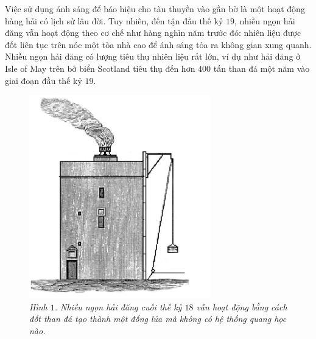 \begin{multicols}{2}
	Việc sử dụng ánh sáng để báo hiệu cho tàu thuyền vào gần bờ là một hoạt động hàng hải có lịch sử lâu đời. Tuy nhiên, đến tận đầu thế kỷ $19$, nhiều ngọn hải đăng vẫn hoạt động theo cơ chế như hàng nghìn năm trước đó: nhiên liệu được đốt liên tục trên nóc một tòa nhà cao để ánh sáng tỏa ra không gian xung quanh. Nhiều ngọn hải đăng có lượng tiêu thụ nhiên liệu rất lớn, ví dụ như hải đăng ở Isle of May trên bờ biển Scotland tiêu thụ đến hơn $400$ tấn than đá một năm vào giai đoạn đầu thế kỷ $19$.
	\begin{figure}[H]
		\vspace*{-5pt}
		\centering
		\captionsetup{labelformat= empty, justification=centering}
		\includegraphics[width= 0.8\linewidth]{1}
		\caption{\small\textit{\color{timhieukhoahoc}Hình $1$. Nhiều ngọn hải đăng cuối thế kỷ $18$ vẫn hoạt động bằng cách đốt than đá tạo thành một đống lửa mà không có hệ thống quang học nào.}}
		\vspace*{-5pt}
	\end{figure}
	\begin{figure}[H]
		\vspace*{5pt}
		\centering
		\captionsetup{labelformat= empty, justification=centering}

\end{figure}
\end{multicols}
